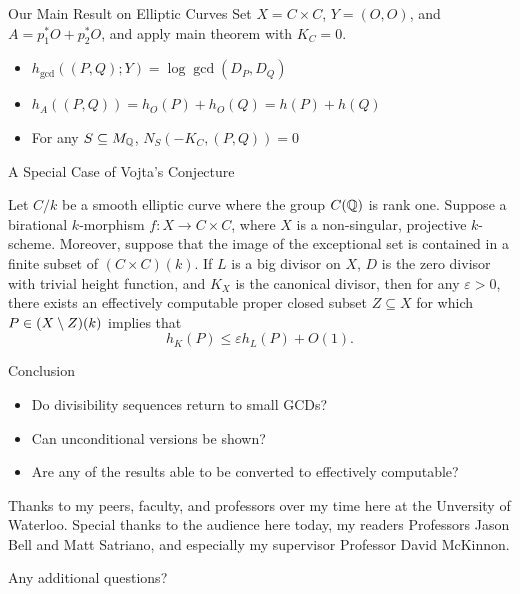 \documentclass{beamer}
\begin{document}
\begin{frame}{Our Main Result on Elliptic Curves}
    Set $X = C \times C$, $Y = (O, O)$, and $A = p_1^* O + p_2^* O$, and apply main theorem with $K_C = 0$.
    \begin{itemize}
        \item $h_{\gcd}((P, Q); Y) = \log \gcd (D_P, D_Q)$
        \item $h_A((P, Q)) = h_O(P) + h_O(Q) = h(P) + h(Q)$
        \item For any $S \subseteq M_{\mathbb{Q}}$, $N_S(-K_C, (P, Q)) = 0$
    \end{itemize}
\end{frame}

\begin{frame}{A Special Case of Vojta's Conjecture}
    \begin{theorem}
        Let $C/k$ be a smooth elliptic curve where the group $C(\mathbb{Q})$ is rank one.
        Suppose a birational $k$-morphism $f : X \to C \times C$,
        where $X$ is a non-singular, projective $k$-scheme.
        Moreover, suppose that the image of the exceptional set is contained in a finite subset of $(C \times C)(k)$.
        If $L$ is a big divisor on $X$,
        $D$ is the zero divisor with trivial height function,
        and $K_X$ is the canonical divisor,
        then for any $\varepsilon > 0$,
        there exists an effectively computable proper closed subset $Z \subseteq X$ for which $P \in (X \setminus Z)(k)$ implies that
        \[
            h_K(P) \leq \varepsilon h_L(P) + O(1).
        \]
    \end{theorem}
\end{frame}

\begin{frame}{Conclusion}
    \begin{itemize}
        \item Do divisibility sequences return to small GCDs?
        \item Can unconditional versions be shown?
        \item Are any of the results able to be converted to effectively computable?
    \end{itemize}
\end{frame}

\begin{frame}
    Thanks to my peers, faculty, and professors over my time here at the Unversity of Waterloo.
    Special thanks to the audience here today,
    my readers Professors Jason Bell and Matt Satriano, 
    and especially my supervisor Professor David McKinnon.

    \vspace{5mm}

    Any additional questions?
\end{frame}
\end{document}
